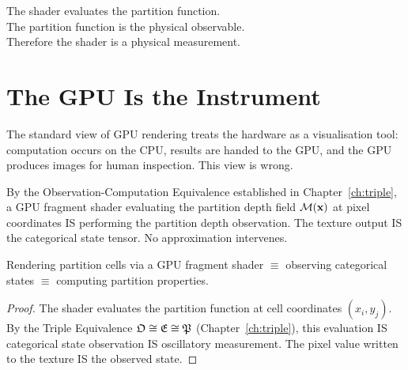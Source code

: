 
\epigraph{%
  The shader evaluates the partition function.\\
  The partition function is the physical observable.\\
  Therefore the shader is a physical measurement.%
}{}

\section{The GPU Is the Instrument}
\label{sec:ch22-gpu-is-instrument}

The standard view of GPU rendering treats the hardware as a visualisation tool:
computation occurs on the CPU, results are handed to the GPU, and the GPU
produces images for human inspection.  This view is wrong.

By the Observation-Computation Equivalence established in
Chapter~\ref{ch:triple}, a GPU fragment shader evaluating the partition depth
field $\mathcal{M}(\mathbf{x})$ at pixel coordinates IS performing the partition
depth observation.  The texture output IS the categorical state tensor.  No
approximation intervenes.

\begin{theorem}
\label{thm:ch22-obs-comp}
  Rendering partition cells via a GPU fragment shader $\equiv$ observing
  categorical states $\equiv$ computing partition properties.
\end{theorem}

\begin{proof}
  The shader evaluates the partition function at cell coordinates $(x_i, y_j)$.
  By the Triple Equivalence $\mathfrak{O}\cong\mathfrak{E}\cong\mathfrak{P}$
  (Chapter~\ref{ch:triple}), this evaluation IS categorical state observation
  IS oscillatory measurement.  The pixel value written to the texture IS
  the observed state.
\end{proof}


